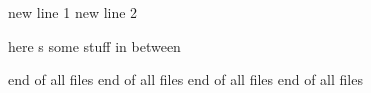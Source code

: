 new line 1
new line 2


here s some stuff in between

end of all files
end of all files
end of all files
end of all files